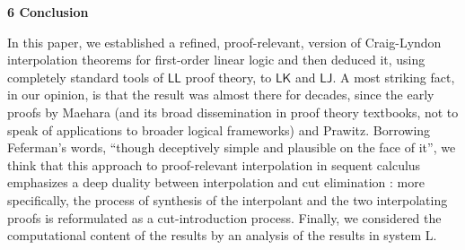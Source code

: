  
 
 


 
\par\medskip\noindent\textbf{6 Conclusion}\par
 
 
In this paper, we established a refined, proof-relevant, version of Craig-Lyndon interpolation theorems for first-order linear logic and then deduced it, using completely standard tools of $\mathsf{LL}$ proof theory, to $\mathsf{LK}$ and $\mathsf{LJ}$. A most striking fact, in our opinion, is that the result was almost there for decades, since the early proofs by Maehara (and its broad dissemination in proof theory textbooks, not to speak of applications to broader logical frameworks) and Prawitz. Borrowing Feferman’s words, “though deceptively simple and plausible on the face of it”, we think that this approach to proof-relevant interpolation in sequent calculus emphasizes a deep duality between interpolation and cut elimination : more specifically, the process of synthesis of the interpolant and the two interpolating proofs is reformulated as a cut-introduction process. Finally, we considered the computational content of the results by an analysis of the results in system L.\par
 
 
 
